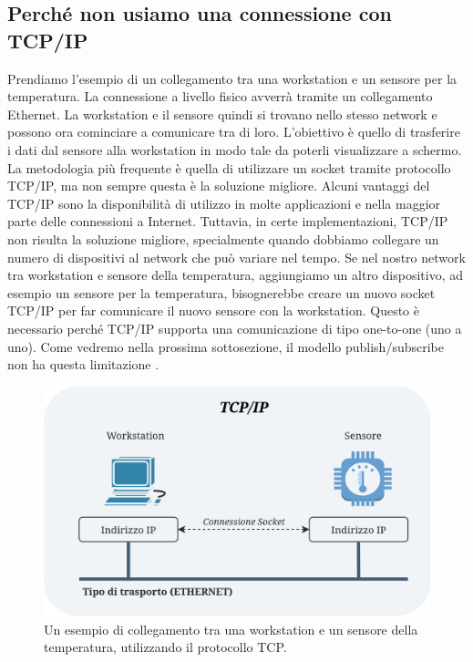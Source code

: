 \subsection{Perché non usiamo una connessione con TCP/IP}
Prendiamo l'esempio di un collegamento tra una workstation e 
un sensore per la temperatura. La connessione a livello fisico
avverrà tramite un collegamento Ethernet. La workstation e il 
sensore quindi si trovano nello stesso network e possono 
ora cominciare a comunicare tra di loro. L'obiettivo è quello
di trasferire i dati dal sensore alla workstation in modo tale
da poterli visualizzare a schermo.
La metodologia più frequente è quella di utilizzare un socket tramite 
protocollo TCP/IP, ma non sempre questa è la soluzione migliore.
Alcuni vantaggi del TCP/IP sono la disponibilità di utilizzo 
in molte applicazioni e nella maggior parte 
delle connessioni a Internet.
Tuttavia, in certe implementazioni, TCP/IP non risulta la soluzione migliore,
specialmente quando dobbiamo collegare un numero di dispositivi al 
network che può variare nel tempo. Se nel nostro network tra workstation e 
sensore della temperatura, aggiungiamo un altro dispositivo, ad esempio un 
sensore per la temperatura, bisognerebbe creare un nuovo socket 
TCP/IP per far comunicare il nuovo sensore con la workstation.
Questo è necessario perché TCP/IP supporta una comunicazione di tipo 
one-to-one (uno a uno). Come vedremo nella prossima sottosezione,
il modello publish/subscribe non ha questa limitazione \cite{1494965}.



\begin{figure}[H]
    \centering
    \includegraphics[width=12cm, keepaspectratio]{img/TCP connessione-Pagina-2.jpg}
    \caption{Un esempio di collegamento tra una workstation e un sensore della temperatura,
    utilizzando il protocollo TCP.}
    \label{TCP connection}
\end{figure}



